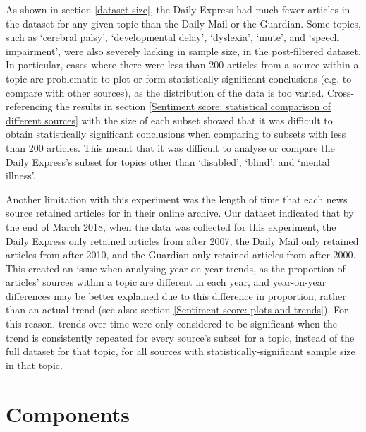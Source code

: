 \documentclass{report}
\newcommand{\textapprox}{\raisebox{0.5ex}{\texttildelow}}  %
\begin{document}
As shown in section \ref{dataset-size}, the Daily Express had much fewer articles in the dataset for any given topic than the Daily Mail or the Guardian.
Some topics, such as `cerebral palsy', `developmental delay', `dyslexia', `mute', and `speech impairment', were also severely lacking in sample size, in the post-filtered dataset.
In particular, cases where there were less than \textapprox200 articles from a source within a topic are problematic to plot or form statistically-significant conclusions (e.g. to compare with other sources), as the distribution of the data is too varied.
Cross-referencing the results in section \ref{Sentiment score: statistical comparison of different sources} with the size of each subset showed that it was difficult to obtain statistically significant conclusions when comparing to subsets with less than \textapprox200 articles.
This meant that it was difficult to analyse or compare the Daily Express's subset for topics other than `disabled', `blind', and `mental illness'.

Another limitation with this experiment was the length of time that each news source retained articles for in their online archive.
Our dataset indicated that by the end of March 2018, when the data was collected for this experiment, the Daily Express only retained articles from after \textapprox2007, the Daily Mail only retained articles from after \textapprox2010, and the Guardian only retained articles from after \textapprox2000. 
This created an issue when analysing year-on-year trends, as the proportion of articles' sources within a topic are different in each year, and year-on-year differences may be better explained due to this difference in proportion, rather than an actual trend (see also: section \ref{Sentiment score: plots and trends}).
For this reason, trends over time were only considered to be significant when the trend is consistently repeated for every source's subset for a topic, instead of the full dataset for that topic, for all sources with statistically-significant sample size in that topic. 

\section{Components} \label{Components}
\end{document}
